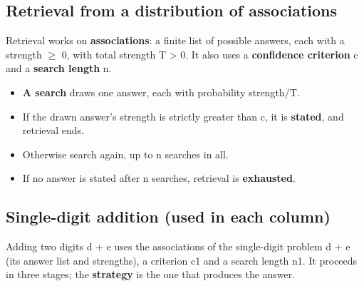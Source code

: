 \subsection{Retrieval from a distribution of associations}\label{retrieval-from-a-distribution-of-associations}

Retrieval works on \textbf{associations}: a finite list of possible answers, each with a strength $\ge$ 0, with total strength T \textgreater{} 0. It also uses a \textbf{confidence criterion} c and a \textbf{search length} n.

\begin{itemize}
\tightlist
\item
  \textbf{A search} draws one answer, each with probability strength/T.
\item
  If the drawn answer's strength is strictly greater than c, it is \textbf{stated}, and retrieval ends.
\item
  Otherwise search again, up to n searches in all.
\item
  If no answer is stated after n searches, retrieval is \textbf{exhausted}.
\end{itemize}

\subsection{Single-digit addition (used in each column)}\label{single-digit-addition-used-in-each-column}

Adding two digits d + e uses the associations of the single-digit problem d + e (its answer list and strengths), a criterion c1 and a search length n1. It proceeds in three stages; the \textbf{strategy} is the one that produces the answer.

